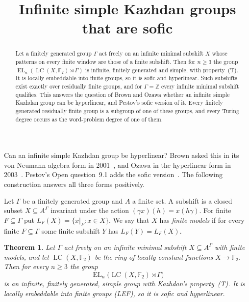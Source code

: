 \documentclass[11pt]{amsart}
\newtheorem{theorem}{Theorem}
\newcommand{\F}{\mathbb F}
\newcommand{\Z}{\mathbb Z}
\newcommand{\LC}{\operatorname{LC}}
\newcommand{\EL}{\operatorname{EL}}
\begin{document}
\title{Infinite simple Kazhdan groups that are sofic}
\author{\paperauthorname}
\date{}

\begin{abstract}
Let a finitely generated group $\Gamma$ act freely on an infinite minimal
subshift $X$ whose patterns on every finite window are those of a finite
subshift. Then for $n\ge3$ the group $\EL_n(\LC(X,\F_2)\rtimes\Gamma)$ is
infinite, finitely generated and simple, with property~\textup{(T)}. It
is locally embeddable into finite groups, so it is sofic and
hyperlinear. Such subshifts exist exactly over residually finite groups,
and for $\Gamma=\Z$ every infinite minimal subshift qualifies. This
answers the question of Brown and Ozawa whether an infinite simple
Kazhdan group can be hyperlinear, and Pestov's sofic version of it.
Every finitely generated residually finite group is a subgroup of one of
these groups, and every Turing degree occurs as the word-problem degree
of one of them.
\end{abstract}
\maketitle

Can an infinite simple Kazhdan group be hyperlinear? Brown asked this
in its von Neumann algebra form in 2001~\cite[\S11, Question~7]{Brown},
and Ozawa in the hyperlinear form in 2003~\cite[p.~527]{Ozawa}.
Pestov's Open question~9.1 adds the sofic version~\cite{Pestov}.
The following construction answers all three forms positively.

Let $\Gamma$ be a finitely generated group and $A$ a finite set. A
subshift is a closed subset $X\subseteq A^\Gamma$ invariant under the
action $(\gamma x)(h)=x(h\gamma)$. For finite $F\subseteq\Gamma$ put
$L_F(X)=\{x|_F:x\in X\}$. We say that $X$ has \emph{finite models} if for
every finite $F\subseteq\Gamma$ some finite subshift $Y$ has
$L_F(Y)=L_F(X)$.

\begin{theorem}\label{thm:main}
Let $\Gamma$ act freely on an infinite minimal subshift $X\subseteq A^\Gamma$
with finite models, and let $\LC(X,\F_2)$ be the ring of locally constant
functions $X\to\F_2$. Then for every $n\ge3$ the group
\[
  \EL_n\bigl(\LC(X,\F_2)\rtimes\Gamma\bigr)
\]
is an infinite, finitely generated, simple group with Kazhdan's
property~\textup{(T)}. It is locally embeddable into finite groups
\textup{(LEF)}, so it is sofic and hyperlinear.
\end{theorem}
\end{document}
